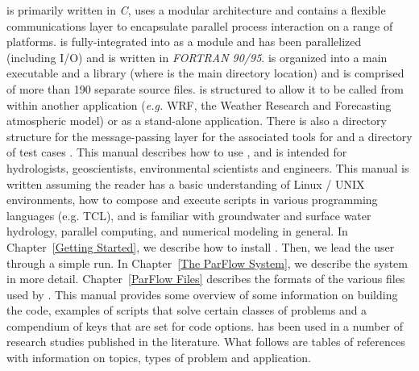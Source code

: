 \parflow{} is primarily written in \emph{C}, uses a modular
architecture and contains a flexible communications layer to
encapsulate parallel process interaction on a range of platforms.
 is fully-integrated into \parflow{} as a module and has
been parallelized (including I/O) and is written in \emph{FORTRAN
  90/95}.  \parflow{} is organized into a main executable
 and a library
 (where  is
the main directory location) and is comprised of more than 190
separate source files.  \parflow{} is structured to allow it to be
called from within another application (\emph{e.g.} WRF, the Weather Research 
and Forecasting atmospheric model) or as a
stand-alone application.  There is also a directory structure for the
message-passing layer  for the
associated tools  for 
 and a directory of test cases
.
This manual describes how to use \parflow{}, and is intended for
hydrologists, geoscientists, environmental scientists and engineers. 
This manual is written assuming the reader has a basic understanding
of Linux / UNIX environments, how to compose and execute scripts in various 
programming languages (e.g. TCL), and is familiar with groundwater and 
surface water hydrology, parallel computing, and numerical modeling in general.
In Chapter~\ref{Getting Started}, we describe how to install \parflow{}.
Then, we lead the user through a simple \parflow{} run.  In
Chapter~\ref{The ParFlow System}, we describe the \parflow{} system in
more detail.  Chapter~\ref{ParFlow Files} describes the formats of the
various files used by \parflow{}.  This manual provides some overview of \parflow{}
some information on building the code, examples of scripts that solve certain classes of
problems and a compendium of keys that are set for code options.
\parflow{} has been used in a number of research studies published in the literature. 
What follows are tables of \parflow{} references with information on topics, types of problem and
application.

